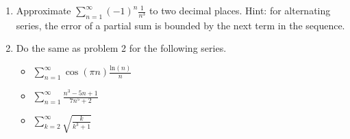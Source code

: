 \documentclass[12pt]{article}
\begin{document}
\begin{enumerate}
\begin{enumerate}
\vfill

%


\item $\displaystyle\sum_{n=1}^{\infty} (-1)^{n-1} \frac{7^n+1}{2^n}$

\vfill

\newpage

\item $\displaystyle\sum_{n=1}^{\infty} (-1)^n \ln(n)$

\vfill

\end{enumerate} 

\item Approximate $\displaystyle\sum_{n=1}^{\infty} (-1)^n \displaystyle\frac{1}{n^3}$
to two decimal places.  Hint: for alternating series, the error of a partial sum is bounded by the next term in the sequence.
\vfill

\pagebreak
\item Do the same as problem 2 for the following series. %
\begin{itemize}
\item $\displaystyle\sum_{n=1}^\infty \cos(\pi n) \frac{\mathrm{ln}(n)}{n}$
\vfill

\item $\displaystyle\sum_{n=1}^{\infty} \frac{n^3-5n+1}{7n^5+2}$

\vfill


\item $\displaystyle\sum_{k=2}^{\infty} \sqrt{\frac{k}{k^3+1}}$


\end{itemize}
\vfill
\end{enumerate}
\end{document}
